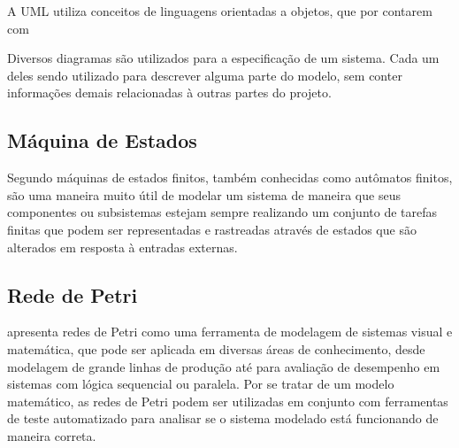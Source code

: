 A UML utiliza conceitos de linguagens orientadas a objetos, que por contarem com 

Diversos diagramas são utilizados para a especificação de um sistema. Cada um deles sendo utilizado para descrever alguma parte do modelo, sem conter informações demais relacionadas à outras partes do projeto. 




\subsection{Máquina de Estados}

Segundo  máquinas de estados finitos, também conhecidas como autômatos finitos, são uma maneira muito útil de modelar um sistema de maneira que seus componentes ou subsistemas estejam sempre realizando um conjunto de tarefas finitas que podem ser representadas e rastreadas através de estados que são alterados em resposta à entradas externas. 






\subsection{Rede de Petri}

 apresenta redes de Petri como uma ferramenta de modelagem de sistemas visual e matemática, que pode ser aplicada em diversas áreas de conhecimento, desde modelagem de grande linhas de produção até para avaliação de desempenho em sistemas com lógica sequencial ou paralela. Por se tratar de um modelo matemático, as redes de Petri podem ser utilizadas em conjunto com ferramentas de teste automatizado para analisar se o sistema modelado está funcionando de maneira correta.


